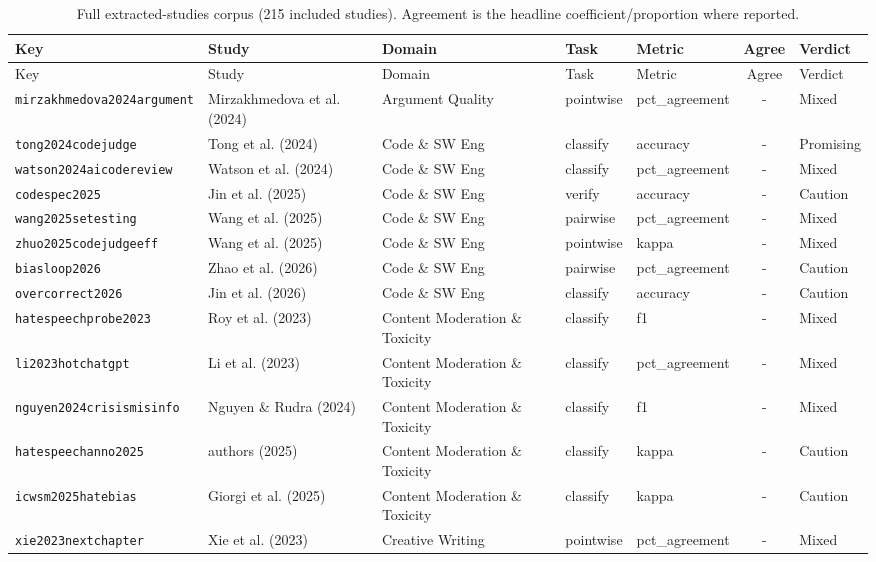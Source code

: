 \footnotesize
\begin{longtable}{@{}l l l l l c l@{}}
\caption{Full extracted-studies corpus (215 included studies). Agreement is the headline coefficient/proportion where reported.}\label{tab:full}\\
\toprule
Key & Study & Domain & Task & Metric & Agree & Verdict \\
\midrule
\endfirsthead
\toprule Key & Study & Domain & Task & Metric & Agree & Verdict \\ \midrule \endhead
\texttt{mirzakhmedova2024argument} & Mirzakhmedova et al. (2024) & Argument Quality & pointwise & pct\_agreement & - & Mixed \\
\texttt{tong2024codejudge} & Tong et al. (2024) & Code \& SW Eng & classify & accuracy & - & Promising \\
\texttt{watson2024aicodereview} & Watson et al. (2024) & Code \& SW Eng & classify & pct\_agreement & - & Mixed \\
\texttt{codespec2025} & Jin et al. (2025) & Code \& SW Eng & verify & accuracy & - & Caution \\
\texttt{wang2025setesting} & Wang et al. (2025) & Code \& SW Eng & pairwise & pct\_agreement & - & Mixed \\
\texttt{zhuo2025codejudgeeff} & Wang et al. (2025) & Code \& SW Eng & pointwise & kappa & - & Mixed \\
\texttt{biasloop2026} & Zhao et al. (2026) & Code \& SW Eng & pairwise & pct\_agreement & - & Caution \\
\texttt{overcorrect2026} & Jin et al. (2026) & Code \& SW Eng & classify & accuracy & - & Caution \\
\texttt{hatespeechprobe2023} & Roy et al. (2023) & Content Moderation \& Toxicity & classify & f1 & - & Mixed \\
\texttt{li2023hotchatgpt} & Li et al. (2023) & Content Moderation \& Toxicity & classify & pct\_agreement & - & Mixed \\
\texttt{nguyen2024crisismisinfo} & Nguyen \& Rudra (2024) & Content Moderation \& Toxicity & classify & f1 & - & Mixed \\
\texttt{hatespeechanno2025} & authors (2025) & Content Moderation \& Toxicity & classify & kappa & - & Caution \\
\texttt{icwsm2025hatebias} & Giorgi et al. (2025) & Content Moderation \& Toxicity & classify & kappa & - & Caution \\
\texttt{xie2023nextchapter} & Xie et al. (2023) & Creative Writing & pointwise & pct\_agreement & - & Mixed \\

\end{longtable}
